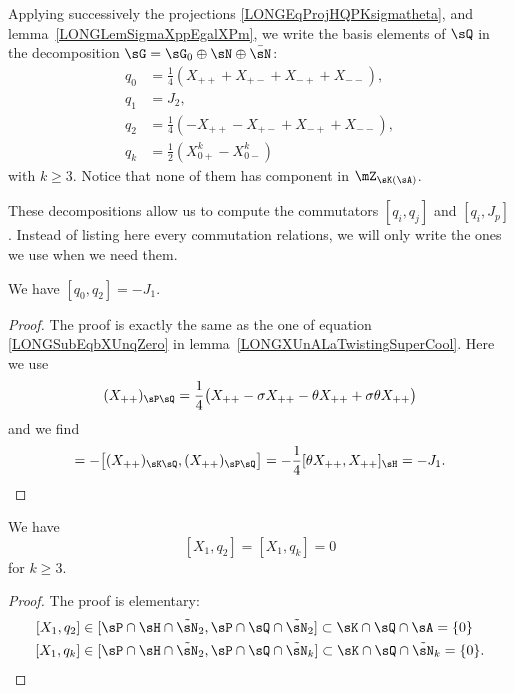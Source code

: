 Applying successively the projections \eqref{LONGEqProjHQPKsigmatheta}, and lemma~\ref{LONGLemSigmaXppEgalXPm}, we write the basis elements of $\sQ$ in the decomposition $\sG=\sG_0\oplus\sN\oplus\bar\sN$:
\begin{subequations}			\label{LONGEqsDecopmQXpmpm}
	\begin{align}
		q_0&=\frac{1}{ 4 }(X_{++}+X_{+-}+X_{-+}+X_{--}),		\\
		q_1&=J_2,							\\
		q_2&=\frac{1}{ 4 }(-X_{++}-X_{+-}+X_{-+}+X_{--}),		\\
		q_k&=\frac{ 1 }{2}(X^{k}_{0+}-X^{k}_{0-})
	\end{align}
\end{subequations}
with $k\geq 3$. Notice that none of them has component in $\mZ_{\sK(\sA)}$.

These decompositions allow us to compute the commutators $[q_i,q_j]$ and $[q_i,J_p]$. Instead of listing here every commutation relations, we will only write the ones we use when we need them.


\begin{lemma}		\label{LONGLemQzQdeuxJun}
	We have $[q_0,q_2]=-J_1$.
\end{lemma}

\begin{proof}
	The proof is exactly the same as the one of equation \eqref{LONGSubEqbXUnqZero} in lemma~\ref{LONGXUnALaTwistingSuperCool}. Here we use
	\begin{equation}
		(X_{++})_{\sP\sQ}=\frac{1}{ 4 }\big( X_{++}-\sigma X_{++}-\theta X_{++}+\sigma\theta X_{++} \big)
	\end{equation}
	and we find
	\begin{equation}
		[q_0,q_2]=-\big[ (X_{++})_{\sK \sQ},(X_{++})_{\sP\sQ} \big]=-\frac{1}{ 4 }[\theta X_{++},X_{++}]_{\sH}=-J_1.
	\end{equation}
\end{proof}

\begin{lemma}
We have
	\begin{equation}		\label{LONGEqXunQdeuxcommutent}
		[X_1,q_2]=[X_1,q_k]=0
	\end{equation}
	for $k\geq 3$.
\end{lemma}
\begin{proof}
	The proof is elementary:
	\begin{equation}
		\begin{aligned}[]
			[X_1,q_2]&\in[\sP\cap\sH\cap\tilde\sN_2,\sP\cap\sQ\cap\tilde\sN_2]\subset\sK\cap\sQ\cap\sA=\{ 0 \}\\
			[X_1,q_k]&\in[\sP\cap\sH\cap\tilde\sN_2,\sP\cap\sQ\cap\tilde\sN_k]\subset\sK\cap\sQ\cap\tilde\sN_k=\{ 0 \}.
		\end{aligned}
	\end{equation}
\end{proof}

